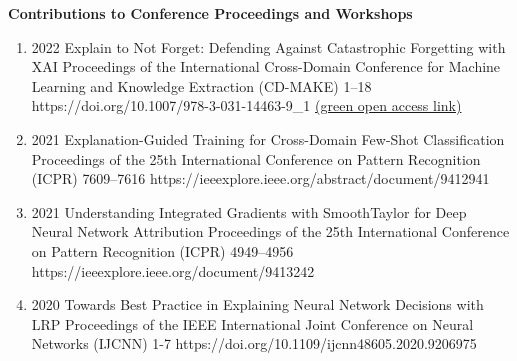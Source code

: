 \documentclass[10pt,a4paper]{article} %
\begin{document}
\headedsection %
{\bf Contributions to Conference Proceedings and Workshops}{}
{
    \begin{enumerate}

        \item {}
                            {2022}
                            {Explain to Not Forget: Defending Against Catastrophic Forgetting with XAI}
                            {Proceedings of the International Cross-Domain Conference for Machine Learning and Knowledge Extraction (CD-MAKE)}
                            {1--18}
                            {https://doi.org/10.1007/978-3-031-14463-9_1}
                            {\href{https://arxiv.org/abs/2205.01929}{(green open access link)}}


        \item {}
                                {2021}
                                {Explanation-Guided Training for Cross-Domain Few-Shot Classification}
                                {Proceedings of the 25th International Conference on Pattern Recognition (ICPR)}
                                {7609--7616}
                                {https://ieeexplore.ieee.org/abstract/document/9412941}

        \item {}
                                {2021}
                                {Understanding Integrated Gradients with SmoothTaylor for Deep Neural Network Attribution}
                                {Proceedings of the 25th International Conference on Pattern Recognition (ICPR)}
                                {4949--4956}
                                {https://ieeexplore.ieee.org/document/9413242}

        \item {}
                                {2020}
                                {Towards Best Practice in Explaining Neural Network Decisions with LRP}
                                {Proceedings of the IEEE International Joint Conference on Neural Networks (IJCNN)}
                                {1-7}
                                {https://doi.org/10.1109/ijcnn48605.2020.9206975}


\end{enumerate}}
\end{document}
